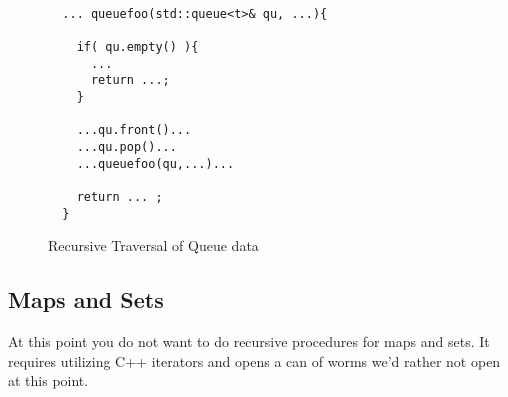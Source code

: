 \documentclass[nobib]{tufte-handout}
\begin{document}
\begin{figure}[!htbp]
\begin{lstlisting}

  ... queuefoo(std::queue<t>& qu, ...){

    if( qu.empty() ){
      ...
      return ...;
    }

    ...qu.front()...
    ...qu.pop()...
    ...queuefoo(qu,...)...

    return ... ;
  }
\end{lstlisting}
\caption{Recursive Traversal of Queue data}
\end{figure}

\subsection{Maps and Sets}

At this point you do not want to do recursive procedures for maps and sets. It requires utilizing C++ iterators and opens a can of worms we'd rather not open at this point.  
\end{document}
